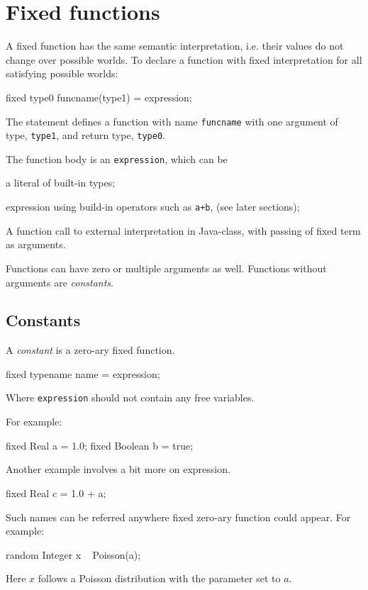 \documentclass[12pt]{article}
\begin{document}
\section{Fixed functions}
A fixed function has the same semantic interpretation, i.e. their values do not change over possible worlds. 
To declare a function with fixed interpretation for all satisfying possible worlds:
\begin{blogcode}
fixed type0 funcname(type1) = expression;
\end{blogcode}
The statement defines a function with name \texttt{funcname} with one argument of type, \texttt{type1}, and return type, \texttt{type0}. 

The function body is an \texttt{expression}, which can be
\begin{itemize*}
\item a literal of built-in types;
\item expression using build-in operators  such as \verb|a+b|, (see later sections);
\item A function call to external interpretation in Java-class, with passing of fixed term as arguments. 
\end{itemize*}

Functions can have zero or multiple arguments as well. Functions without arguments are \emph{constants}. 

\subsection{Constants}
A {\em constant} is a zero-ary fixed function.
\begin{blogcode}
fixed typename name = expression;
\end{blogcode} 
Where \texttt{expression} should not contain any free variables. 

For example:
\begin{blogcode}
fixed Real a = 1.0;
fixed Boolean b = true;
\end{blogcode}

Another example involves a bit more on expression.
\begin{blogcode}
fixed Real c = 1.0 + a;
\end{blogcode}

Such names can be referred anywhere fixed zero-ary function could appear.
For example:
\begin{blogcode}
random Integer x ~ Poisson(a);
\end{blogcode}
Here $x$ follows a Poisson distribution with the parameter set to $a$.
\end{document}
